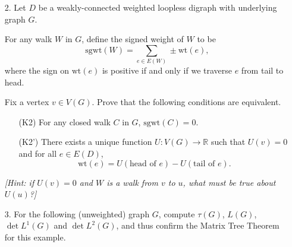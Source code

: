 \documentclass[12pt]{article}
\newcommand{\R}{\mathbb{R}}
\newcommand{\wt}[1]{\text{wt}({#1})}
\newcommand{\sgwt}[1]{\text{sgwt}({#1})}
\begin{document}
\begin{enumerate}
\item[2.] Let $D$ be a weakly-connected weighted loopless digraph with underlying graph $G$.

For any walk $W$ in $G$, define the signed weight of $W$ to be \[\sgwt{W} = \sum_{e\in E(W)}\pm \wt{e},\] where the sign on $\wt{e}$ is positive if and only if we traverse $e$ from tail to head.

Fix a vertex $v\in V(G)$. Prove that the following conditions are equivalent.

\begin{enumerate}
    \item[(K2)] For any closed walk $C$ in $G$, $\sgwt{C}=0$.
    \item [(K2')] There exists a unique function $U:V(G)\to \R$ such that $U(v)=0$ and for all $e\in E(D)$, \[\wt{e} = U(\text{head of $e$}) - U(\text{tail of $e$}).\]
\end{enumerate}

\emph{[Hint: if $U(v)=0$ and $W$ is a walk from $v$ to $u$, what must be true about $U(u)$?]}

\item[3.] For the following (unweighted) graph $G$, compute $\tau(G)$, $L(G)$, $\det L^1(G)$ and $\det L^2(G)$, and thus confirm the Matrix Tree Theorem for this example.

\begin{center}
\end{center}


\end{enumerate}
\end{document}
